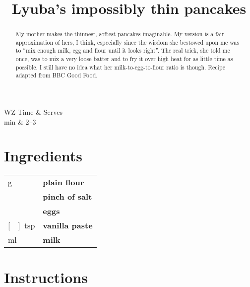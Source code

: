 \documentclass[main.tex]{subfiles}
\title{Lyuba's impossibly thin pancakes}
\begin{document}
\maketitle

\begin{margintable}
\begin{tabularx}{\textwidth}{WZ}
Time  & Serves\\ 
 min & 2--3
\end{tabularx}
\end{margintable}

\begin{abstract}
My mother makes the thinnest, softest pancakes imaginable. My version is a fair approximation of hers, I think, especially since the wisdom she bestowed upon me was to ``mix enough milk, egg and flour until it looks right''. The real trick, she told me once, was to mix a very loose batter and to fry it over high heat for as little time as possible. I still have no idea what her milk-to-egg-to-flour ratio is though.
\linebreak
Recipe adapted from BBC Good Food.
\end{abstract}

\section{Ingredients}

\vspace*{-\baselineskip}
\begin{table}[ht]
	\begin{tabularx}{\textwidth}{>{\hsize=0.333\hsize}X>{\bf\hsize=1\hsize}X}
	\unit[100]{g} & plain flour\\
	\unit[]{} & pinch of salt\\
	\unit[2]{} & eggs\\
	\unit[\nicefrac{1}{4}]{tsp} & vanilla paste\\
	\unit[350]{ml} & milk\\
	\end{tabularx}
\end{table}

\section{Instructions}
\end{document}
